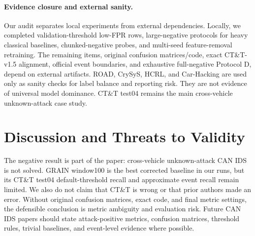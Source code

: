 \documentclass[runningheads]{llncs}%
\begin{document}
\begin{table}[!htbp]
\caption{Low-FPR and approximate event evidence on CT\&T test04.  Validation rows use thresholds selected on the train-derived validation split; best-test rows are upper-bound score-separability diagnostics.}
\label{tab:lowfpr}
\centering
{}
\end{table}

\paragraph{Evidence closure and external sanity.}
Our audit separates local experiments from external dependencies.  Locally, we completed validation-threshold low-FPR rows, large-negative protocols for heavy classical baselines, chunked-negative probes, and multi-seed feature-removal retraining.  The remaining items, original confusion matrices/code, exact CT\&T-v1.5 alignment, official event boundaries, and exhaustive full-negative Protocol D, depend on external artifacts.  ROAD, CrySyS, HCRL, and Car-Hacking are used only as sanity checks for label balance and reporting risk.  They are not evidence of universal model dominance.  CT\&T test04 remains the main cross-vehicle unknown-attack case study.

\section{Discussion and Threats to Validity}
The negative result is part of the paper: cross-vehicle unknown-attack CAN IDS is not solved.  GRAIN window100 is the best corrected baseline in our runs, but its CT\&T test04 default-threshold recall and approximate event recall remain limited.  We also do not claim that CT\&T is wrong or that prior authors made an error.  Without original confusion matrices, exact code, and final metric settings, the defensible conclusion is metric ambiguity and evaluation risk.  Future CAN IDS papers should state attack-positive metrics, confusion matrices, threshold rules, trivial baselines, and event-level evidence where possible.
\end{document}
